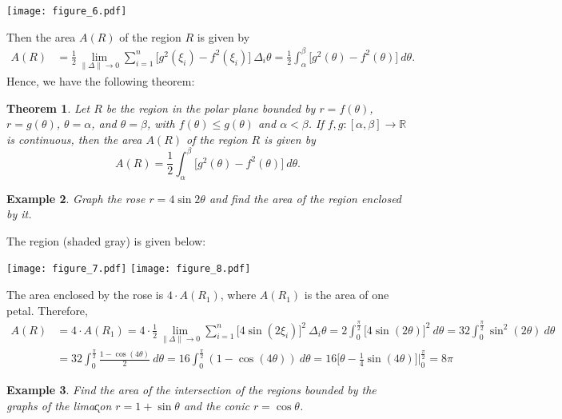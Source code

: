 \documentclass[12pt,twoside]{article}
\newtheorem{theorem}{\bf Theorem}[section]
\newtheorem{example}[theorem]{\bf Example}
\begin{document}
\begin{center}
\texttt{[image: figure\_6.pdf]}
\end{center}

Then the area $A(R)$ of the region $R$ is given by
\begin{align*}
A(R)&=\tfrac{1}{2}\lim_{\|\Delta\|\to0} \sum_{i=1}^{n}\Big[g^2(\xi_i)-f^2(\xi_i)\Big]\ \Delta_i\theta=\frac{1}{2}\int_{\alpha}^{\beta}\Big[g^2(\theta)-f^2(\theta)\Big]\ d\theta.
\end{align*}
Hence, we have the following theorem:

\begin{theorem}
Let $R$ be the region in the polar plane bounded by $r=f(\theta)$, $r=g(\theta)$, $\theta=\alpha$, and $\theta=\beta$, with $f(\theta)\leq g(\theta)$ and $\alpha<\beta$. If $f,g:[\alpha,\beta]\to\mathbb{R}$ 
is continuous, then the area $A(R)$ of the region $R$
is given by 
$$A(R)=\frac{1}{2}\int_{\alpha}^{\beta}\Big[g^2(\theta)-f^2(\theta)\Big]\ d\theta.$$
\end{theorem}

\begin{example}\rm
Graph the rose $r=4\sin 2\theta$ and find the area of the region enclosed by it.
\end{example}

 The region (shaded gray) is given below:

\begin{center}
\texttt{[image: figure\_7.pdf]} \qquad \texttt{[image: figure\_8.pdf]}
\end{center}

The area enclosed by the rose is $4\cdot A(R_1)$, where $A(R_1)$ is the area of one petal. Therefore,
\begin{align*}
A(R) &= 4\cdot A(R_1) = 4\cdot\frac{1}{2}\lim_{\|\Delta\|\to0}\sum_{i=1}^{n}\Big[4\sin(2\xi_i)\Big]^2\ \Delta_i\theta = 2\int_{0}^{\frac{\pi}{2}}\Big[4\sin(2\theta)\Big]^2\ d\theta = 32\int_{0}^{\frac{\pi}{2}}\sin^2(2\theta)\ d\theta\\
&= 32\int_{0}^{\frac{\pi}{2}}\frac{1-\cos(4\theta)}{2}\ d\theta = 16\int_{0}^{\frac{\pi}{2}}(1-\cos(4\theta))\ d\theta = 16\Big[\theta-\tfrac{1}{4}\sin(4\theta)\Big]\bigg|_{0}^{\frac{\pi}{2}} = 8\pi
\end{align*}

\begin{example}\rm
Find the area of the intersection of the regions bounded by the graphs of the lima\k{c}on $r=1+\sin\theta$ and the conic $r=\cos\theta$.
\end{example}
\end{document}
